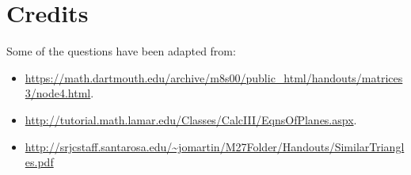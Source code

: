 \documentclass{exam}
\begin{document}
\section*{Credits}
Some of the questions have been adapted from:
\begin{itemize}
\item \url{https://math.dartmouth.edu/archive/m8s00/public_html/handouts/matrices3/node4.html}.
\item \url{http://tutorial.math.lamar.edu/Classes/CalcIII/EqnsOfPlanes.aspx}.
\item \url{http://srjcstaff.santarosa.edu/~jomartin/M27Folder/Handouts/SimilarTriangles.pdf}
\end{itemize}
\end{document}
